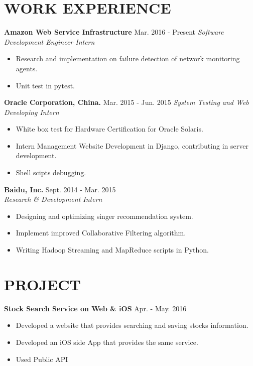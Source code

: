 \documentclass[margin,10pt]{res} %
\begin{document}
\begin{resume}
\section{WORK EXPERIENCE}
\leftmargini=4mm
{\bf Amazon Web Service Infrastructure} \hfill Mar. 2016 - Present 
\textit{Software Development Engineer Intern}
\begin{itemize}
\item Research and implementation on failure detection of network monitoring agents.
\item Unit test in pytest.
\end{itemize}

{\bf Oracle Corporation, China.} \hfill Mar. 2015 - Jun. 2015 
\textit{System Testing and Web Developing Intern}
\begin{itemize}
\item White box test for Hardware Certification for Oracle Solaris.
\item Intern Management Website Development in Django, contributing in server development.
\item Shell scipts debugging.
\end{itemize}

{\bf Baidu, Inc.} \hfill Sept. 2014 - Mar. 2015 \\
\textit{Research & Development Intern}
\begin{itemize}  %
\item Designing and optimizing singer recommendation system.
\item Implement improved Collaborative Filtering algorithm.
\item Writing Hadoop Streaming and MapReduce scripts in Python. 
\end{itemize}

\section{PROJECT}
{\bf Stock Search Service on Web & iOS} \hfill Apr. - May. 2016\\

\begin{itemize}  %
\item Developed a website that provides searching and saving stocks information.
\item Developed an iOS side App that provides the same service.
\item Used Public API
\end{itemize}


\end{resume}
\end{document}
